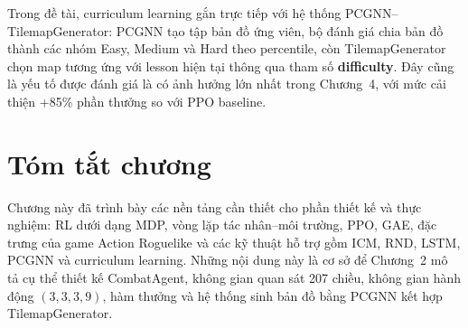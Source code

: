 Trong đề tài, curriculum learning gắn trực tiếp với hệ thống PCGNN--TilemapGenerator: PCGNN tạo tập bản đồ ứng viên, bộ đánh giá chia bản đồ thành các nhóm Easy, Medium và Hard theo percentile, còn TilemapGenerator chọn map tương ứng với lesson hiện tại thông qua tham số \textbf{difficulty}. Đây cũng là yếu tố được đánh giá là có ảnh hưởng lớn nhất trong Chương~4, với mức cải thiện +85\% phần thưởng so với PPO baseline.

\section{Tóm tắt chương}

Chương này đã trình bày các nền tảng cần thiết cho phần thiết kế và thực nghiệm: RL dưới dạng MDP, vòng lặp tác nhân--môi trường, PPO, GAE, đặc trưng của game Action Roguelike và các kỹ thuật hỗ trợ gồm ICM, RND, LSTM, PCGNN và curriculum learning. Những nội dung này là cơ sở để Chương~2 mô tả cụ thể thiết kế CombatAgent, không gian quan sát 207 chiều, không gian hành động $(3,3,3,9)$, hàm thưởng và hệ thống sinh bản đồ bằng PCGNN kết hợp TilemapGenerator.
